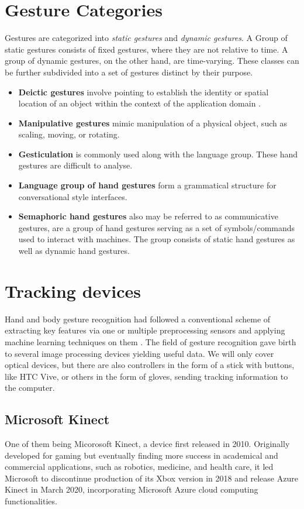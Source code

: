 
\section{Gesture Categories}
Gestures are categorized into \textit{static gestures} and \textit{dynamic gestures}. A Group of static gestures consists of fixed gestures, where they are not relative to time. A group of dynamic gestures, on the other hand, are time-varying. These classes can be further subdivided into a set of gestures distinct by their purpose.


\begin{itemize}
	\item \textbf{Deictic gestures} involve pointing to establish the identity or spatial location of an object within the context of the application domain \cite{taxonomi}.
    \item \textbf{Manipulative gestures} mimic manipulation of a physical object, such as scaling, moving, or rotating.
    \item \textbf{Gesticulation} is commonly used along with the language group. These hand gestures are difficult to analyse.
	\item \textbf{Language group of hand gestures} form a grammatical structure for conversational style interfaces.
    \item \textbf{Semaphoric hand gestures} also may be referred to as communicative gestures, are a group of hand gestures serving as a set of symbols/commands used to interact with machines. The group consists of static hand gestures as well as dynamic hand gestures. 
\end{itemize}


\section{Tracking devices}
Hand and body gesture recognition had followed a conventional scheme of extracting key features via one or multiple preprocessing sensors and applying machine learning techniques on them \cite{avola}. The field of gesture recognition gave birth to several image processing devices yielding useful data.
We will only cover optical devices, but there are also controllers in the form of a stick with buttons, like HTC Vive, or others in the form of gloves, sending tracking information to the computer.
\subsection{Microsoft Kinect}
One of them being Micorosoft Kinect, a device first released in 2010. Originally developed for gaming but eventually finding more success in academical and commercial applications, such as robotics, medicine, and health care, it led Microsoft to discontinue production of its Xbox version in 2018 and release Azure Kinect in March 2020, incorporating Microsoft Azure cloud computing functionalities.

